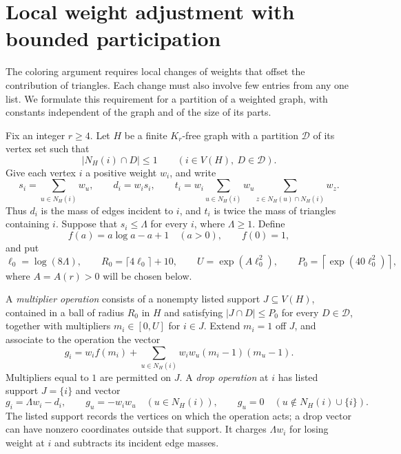 \section{Local weight adjustment with bounded participation}
\label{sec:adjustment}

The coloring argument requires local changes of weights that offset the
contribution of triangles.  Each change must also involve few entries
from any one list.  We formulate this requirement for a partition of a
weighted graph, with constants independent of the graph and of the size
of its parts.

Fix an integer $r\ge4$.  Let $H$ be a finite $K_r$-free graph with a
partition $\mathcal D$ of its vertex set such that
\[
 |N_H(i)\cap D|\le1
 \qquad(i\in V(H),\ D\in\mathcal D).
\]
Give each vertex $i$ a positive weight $w_i$, and write
\begin{equation}
\label{eq:weighted-local-masses}
 s_i=\sum_{u\in N_H(i)}w_u,\qquad
 d_i=w_i s_i,\qquad
 t_i=w_i\sum_{u\in N_H(i)}w_u
                 \sum_{z\in N_H(u)\cap N_H(i)}w_z.
\end{equation}
Thus $d_i$ is the mass of edges incident to $i$, and $t_i$ is twice the
mass of triangles containing $i$.  Suppose that $s_i\le\Lambda$ for
every $i$, where $\Lambda\ge1$.  Define
\[
 f(a)=a\log a-a+1\quad(a>0),\qquad f(0)=1,
\]
and put
\begin{equation}
\label{eq:adjustment-parameters}
 \ell_0=\log(8\Lambda),\qquad
 R_0=\lceil4\ell_0\rceil+10,\qquad
 U=\exp(A\ell_0^2),\qquad
 P_0=\left\lceil\exp(40\ell_0^2)\right\rceil,
\end{equation}
where $A=A(r)>0$ will be chosen below.

A \emph{multiplier operation} consists of a nonempty listed support
$J\subseteq V(H)$, contained in a ball of radius $R_0$ in $H$ and
satisfying $|J\cap D|\le P_0$ for every $D\in\mathcal D$, together with
multipliers $m_i\in[0,U]$ for $i\in J$.  Extend $m_i=1$ off $J$, and
associate to the operation the vector
\begin{equation}
\label{eq:multiplier-vector}
 g_i=w_i f(m_i)+\sum_{u\in N_H(i)}
                       w_iw_u(m_i-1)(m_u-1).
\end{equation}
Multipliers equal to $1$ are permitted on $J$.  A \emph{drop operation}
at $i$ has listed support $J=\{i\}$ and vector
\begin{equation}
\label{eq:drop-vector}
 g_i=\Lambda w_i-d_i,\qquad
 g_u=-w_iw_u\quad(u\in N_H(i)),\qquad
 g_u=0\quad(u\notin N_H(i)\cup\{i\}).
\end{equation}
The listed support records the vertices on which the operation acts; a
drop vector can have nonzero coordinates outside that support.  It charges
$\Lambda w_i$ for losing weight at $i$ and subtracts its incident edge
masses.

